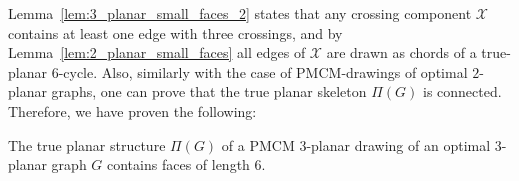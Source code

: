 
Lemma~\ref{lem:3_planar_small_faces_2} states that any crossing component $\mathcal{X}$  contains at least one edge with three crossings, and by Lemma~\ref{lem:2_planar_small_faces} all edges of $\mathcal{X}$ are drawn as chords of a true-planar $6$-cycle. Also, similarly with the case of PMCM-drawings  of optimal $2$-planar graphs, one can prove that the true planar skeleton $\Pi(G)$ is connected. Therefore, we have proven the following:
 

 

\begin{corollary}\label{cor:3_planar_faces_general}
The true planar structure $\Pi(G)$ of a PMCM $3$-planar drawing of an optimal $3$-planar graph $G$ contains faces of length $6$.
\end{corollary}


